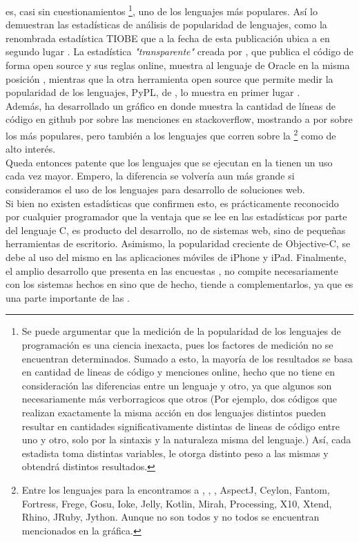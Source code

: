 \java es, casi sin cuestionamientos \footnote{
	Se puede argumentar que la medición de la popularidad de
	los lenguajes de programación es una ciencia inexacta, pues los factores de medición no
	se encuentran determinados. Sumado a esto, la mayoría de los resultados se basa en
	cantidad de lineas de código y menciones online, hecho que no tiene en consideración las
	diferencias entre un lenguaje y otro, ya que algunos son necesariamente más
	verborragicos que otros (Por ejemplo, dos códigos que realizan exactamente la misma
	acción en dos lenguajes distintos pueden resultar en cantidades significativamente
	distintas de lineas de código entre uno y otro, solo por la sintaxis y la naturaleza
	misma del lenguaje.) Así, cada estadista toma distintas variables, le otorga distinto
	peso a las mismas y obtendrá distintos resultados.
}, uno de los lenguajes más populares. Así lo demuestran las estadísticas de análisis de
popularidad de lenguajes, como la renombrada estadística TIOBE que a la fecha de esta
publicación ubica a \java en segundo lugar . La estadística
\emph{"transparente"} creada por , que publica el
código de forma open source y sus reglas online, muestra al lenguaje de Oracle en la misma
posición , mientras que la otra herramienta open source que
permite medir la popularidad de los lenguajes, PyPL, de
, lo muestra en primer lugar
.\\
Además,  ha desarrollado un gráfico en donde muestra la
cantidad de líneas de código en \gls{github} por sobre las menciones en
\gls{stackoverflow}, mostrando a \java por sobre los más populares, pero también a los
lenguajes que corren sobre la \jvm\footnote{
	Entre los lenguajes para la \jvm encontramos a \scala, \clojure, \groovy, AspectJ,
	Ceylon, Fantom, Fortress, Frege, Gosu, Ioke, Jelly, Kotlin, Mirah, Processing, X10,
	Xtend, Rhino, JRuby, Jython. Aunque no son todos y no todos se encuentran mencionados
	en la gráfica.
} como de alto interés.\\
Queda entonces patente que los lenguajes que se ejecutan en la \jvm tienen un uso cada vez
mayor. Empero, la diferencia se volvería aun más grande si consideramos el uso de los
lenguajes para desarrollo de soluciones web.\\
Si bien no existen estadísticas que confirmen esto, es prácticamente reconocido por
cualquier programador que la ventaja que se lee en las estadísticas por parte del lenguaje
C, es producto del desarrollo, no de sistemas web, sino de pequeñas herramientas de
escritorio. Asimismo, la popularidad creciente de Objective-C, se debe al uso del mismo en
las aplicaciones móviles de iPhone y iPad. Finalmente, el amplio desarrollo que presenta
en las encuestas \js, no compite necesariamente con los sistemas hechos en \jvm sino que
de hecho, tiende a complementarlos, ya que es una parte importante de las
\rias{}.\\



